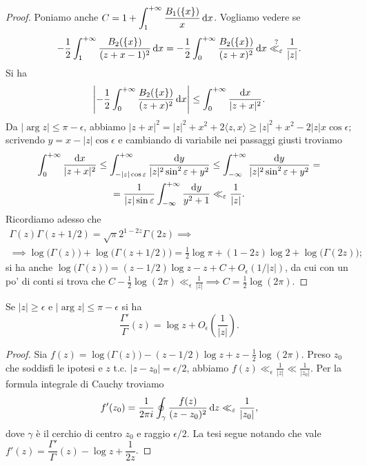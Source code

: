 \begin{proof}
  Poniamo anche $\displaystyle C=1+\int_1^{+\infty} \frac{B_1(\{x\})}{x}\mathop{}\!\mathrm{d} x$. Vogliamo vedere se
  $$-\frac{1}{2}\int_1^{+\infty}\frac{B_2(\{x\})}{(z+x-1)^2}\mathop{}\!\mathrm{d} x=-\frac{1}{2}\int_0^{+\infty}\frac{B_2(\{x\})}{(z+x)^2}\mathop{}\!\mathrm{d} x \overset{?}{\ll_{\varepsilon}} \frac{1}{|z|}.$$
  Si ha
  $$\left|-\frac{1}{2}\int_0^{+\infty}\frac{B_2(\{x\})}{(z+x)^2}\mathop{}\!\mathrm{d} x\right| \le \int_0^{+\infty} \frac{\mathop{}\!\mathrm{d} x}{|z+x|^2}.$$
  Da $|\arg{z}| \le \pi-\epsilon$, abbiamo $|z+x|^2=|z|^2+x^2+2\langle z,x \rangle \ge |z|^2+x^2-2|z|x\cos{\epsilon}$; scrivendo $y=x-|z|\cos{\epsilon}$ e cambiando di variabile nei passaggi giusti troviamo
  \begin{gather*}
    \int_0^{+\infty} \frac{\mathop{}\!\mathrm{d} x}{|z+x|^2} \le \int_{-|z|\cos{\varepsilon}}^{+\infty} \frac{\mathop{}\!\mathrm{d} y}{|z|^2\sin^2{\varepsilon}+y^2} \le \int_{-\infty}^{+\infty} \frac{\mathop{}\!\mathrm{d} y}{|z|^2\sin^2{\varepsilon}+y^2}= \\
    =\frac{1}{|z|\sin{\varepsilon}}\int_{-\infty}^{+\infty} \frac{\mathop{}\!\mathrm{d} y}{y^2+1} \ll_{\varepsilon} \frac{1}{|z|}.
  \end{gather*}
  Ricordiamo adesso che
  \begin{gather*}
    \Gamma(z)\Gamma(z+1/2)=\sqrt{\pi}2^{1-2z}\Gamma(2z) \implies \\
    \implies \log\big(\Gamma(z)\big)+\log\big(\Gamma(z+1/2)\big)=\frac{1}{2}\log{\pi}+(1-2z)\log{2}+\log\big(\Gamma(2z)\big);
  \end{gather*}
  si ha anche $\log\big(\Gamma(z)\big)=(z-1/2)\log{z}-z+C+O_{\epsilon}(1/|z|)$, da cui con un po' di conti si trova che $C-\frac{1}{2}\log(2\pi) \ll_{\epsilon} \frac{1}{|z|} \implies C=\frac{1}{2}\log(2\pi)$.
\end{proof}

\begin{cor} \label{gammaprimosu}
  Se $|z| \ge \epsilon$ e $|\arg{z}| \le \pi-\epsilon$ si ha $$\frac{\Gamma'}{\Gamma}(z)=\log{z}+O_{\epsilon}\left(\frac{1}{|z|}\right).$$
\end{cor}

\begin{proof}
  Sia $f(z)=\log\big(\Gamma(z)\big)-(z-1/2)\log{z}+z-\frac{1}{2}\log(2\pi)$. Preso $z_0$ che soddisfi le ipotesi e $z$ t.c. $|z-z_0|=\epsilon/2$, abbiamo $f(z) \ll_{\epsilon} \frac{1}{|z|} \ll \frac{1}{|z_0|}$. Per la formula integrale di Cauchy troviamo
  $$f'(z_0)=\frac{1}{2\pi i}\oint_{\gamma} \frac{f(z)}{(z-z_0)^2}\mathop{}\!\mathrm{d} z \ll_{\varepsilon} \frac{1}{|z_0|},$$
  dove $\gamma$ è il cerchio di centro $z_0$ e raggio $\epsilon/2$. La tesi segue notando che vale $f'(z)=\dfrac{\Gamma'}{\Gamma}(z)-\log{z}+\dfrac{1}{2z}$.
\end{proof}

